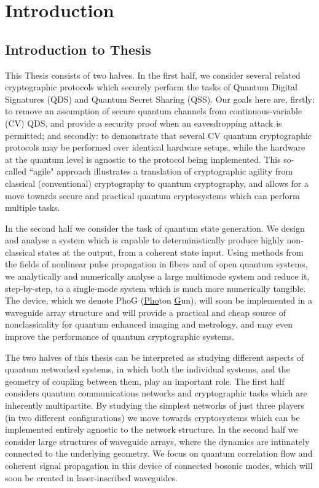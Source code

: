 \chapter{Introduction}


\section{Introduction to Thesis}

This Thesis consists of two halves. In the first half, we consider several related cryptographic protocols which securely perform the tasks of Quantum Digital Signatures (QDS) and Quantum Secret Sharing (QSS). Our goals here are, firstly: to remove an assumption of secure quantum channels from continuous-variable (CV) QDS, and provide a security proof when an eavesdropping attack is permitted; and secondly: to demonstrate that several CV quantum cryptographic protocols may be performed over identical hardware setups, while the hardware at the quantum level is agnostic to the protocol being implemented. This so-called ``agile" approach illustrates a translation of cryptographic agility from classical (conventional) cryptography to quantum cryptography, and allows for a move towards secure and practical quantum cryptosystems which can perform multiple tasks.

In the second half we consider the task of quantum state generation. We design and analyse a system which is capable to deterministically produce highly non-classical states at the output, from a coherent state input. Using methods from the fields of nonlinear pulse propagation in fibers and of open quantum systems, we analytically and numerically analyse a large multimode system and reduce it, step-by-step, to a single-mode system which is much more numerically tangible. The device, which we denote PhoG (\underline{Pho}ton \underline{G}un), will soon be implemented in a waveguide array structure and will provide a practical and cheap source of nonclassicality for quantum enhanced imaging and metrology, and may even improve the performance of quantum cryptographic systems. 

The two halves of this thesis can be interpreted as studying different aspects of quantum networked systems, in which both the individual systems, and the geometry of coupling between them, play an important role. The first half considers quantum communications networks and cryptographic tasks which are inherently multipartite. By studying the simplest networks of just three players (in two different configurations) we move towards cryptosystems which can be implemented entirely agnostic to the network structure. In the second half we consider large structures of waveguide arrays, where the dynamics are intimately connected to the underlying geometry. We focus on quantum correlation flow and coherent signal propagation in this device of connected bosonic modes, which will soon be created in laser-inscribed waveguides.


